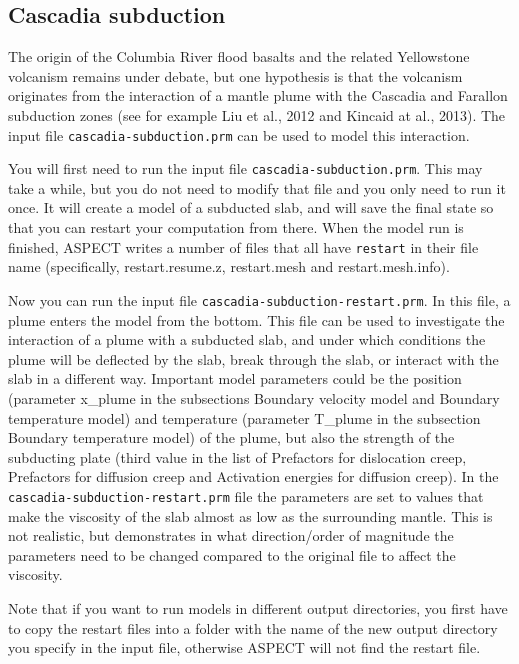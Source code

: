 \documentclass[notitlepage]{article}
\begin{document}
\subsection{Cascadia subduction}

The origin of the Columbia River flood basalts and the related Yellowstone volcanism remains under debate, 
but one hypothesis is that the volcanism originates from the interaction of a mantle plume with the 
Cascadia and Farallon subduction zones (see for example Liu et al., 2012 and Kincaid at al., 2013). 
The input file \texttt{cascadia-subduction.prm} can be used to model this interaction. 

You will first need to run the input file \texttt{cascadia-subduction.prm}. This may take a while, but you
do not need to modify that file and you only need to run it once. 
It will create a model of a subducted slab, and will save the final state so that 
you can restart your computation from there. When the model run is finished, ASPECT writes a number of files 
that all have \texttt{restart} in their file name (specifically, restart.resume.z, restart.mesh and restart.mesh.info). 

Now you can run the input file \texttt{cascadia-subduction-restart.prm}. In this file, a plume enters the model 
from the bottom. This file can be used to investigate the interaction of a plume with a subducted slab, and under
which conditions the plume will be deflected by the slab, break through the slab, or interact with the slab in a 
different way. Important model parameters could be the position (parameter x\_plume in the subsections Boundary 
velocity model and Boundary temperature model) and temperature (parameter T\_plume in the subsection Boundary 
temperature model) of the plume, but also the strength of the subducting plate (third value in the list of 
Prefactors for dislocation creep, Prefactors for diffusion creep and Activation energies for diffusion creep). 
In the \texttt{cascadia-subduction-restart.prm} file the parameters are set to values that make the viscosity of the
slab almost as low as the surrounding mantle. This is not realistic, but demonstrates in what direction/order
of magnitude the parameters need to be changed compared to the original file to affect the viscosity. 

Note that if you want to run models in different output directories, you first have to copy the restart files into a 
folder with the name of the new output directory you specify in the input file, otherwise ASPECT will not find 
the restart file. 
\end{document}
